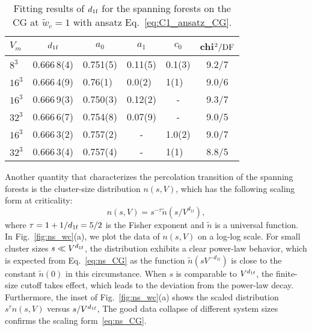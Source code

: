 \begin{table}[tb]
\centering
\vspace{3ex}
\caption{Fitting results of ${d_{1\textrm{f}}}$ for the spanning forests on the CG at $\tilde{w}_c = 1$ with ansatz Eq.~\eqref{eq:C1_ansatz_CG}.}
\label{tab:C1_wc_CG} 
\begin{tabular}{|lllllc|}
\hline 
$V_{m}$   &\multicolumn{1}{c}{${d_{1\textrm{f}}}$}   &\multicolumn{1}{c}{$a_0$}    
&\multicolumn{1}{c}{$a_1$} &\multicolumn{1}{c}{$c_0$}
& chi$^2/{\rm DF}$     \\
\hline 
$8^3$     &0.666\,8(4)    &0.751(5)   &0.11(5)    &0.1(3)     &9.2/7\\ 
$16^{3}$    &0.666\,4(9)    &0.76(1)    &0.0(2)     &1(1)       &9.0/6\\ 

$16^{3}$    &0.666\,9(3) 	&0.750(3)  	&0.12(2)   	&\multicolumn{1}{c}{-}	&9.3/7\\ 
$32^{3}$    &0.666\,6(7) 	&0.754(8)  	&0.07(9)   	&\multicolumn{1}{c}{-}	&9.0/5\\ 

$16^{3}$    &0.666\,3(2) 	&0.757(2)  	&\multicolumn{1}{c}{-}     	&1.0(2)    	&9.0/7\\ 
$32^{3}$    &0.666\,3(4) 	&0.757(4)  	&\multicolumn{1}{c}{-}     	&1(1)      	&8.8/5\\ 
\hline 
\end{tabular} 
\vspace{3ex}
\end{table} 

Another quantity that characterizes the percolation transition of the spanning forests is the cluster-size distribution $n(s, V)$, which has the following
scaling form at criticality:
\begin{equation}\label{eq:ns_CG}
	n(s, V) = s^{-\tau} \tilde{n}(s/V^{d_{1\textrm{f}}}),
\end{equation}
where $\tau = 1+ 1/{d_{1\textrm{f}}} = 5/2$ is the Fisher exponent and $\tilde{n}$ is a universal function. 
In Fig.~\ref{fig:ns_wc}(a), we plot the data of $n(s, V)$ on a log-log scale. For small cluster sizes $s \ll V^{{d_{1\textrm{f}}}}$, the distribution exhibits a clear power-law behavior, which
is expected from Eq.~\eqref{eq:ns_CG} as the function $\tilde{n}(s V^{-d_{1\textrm{f}}})$ is close to the constant $\tilde{n}(0)$ in this
circumstance. When $s$ is comparable to $V^{{d_{1\textrm{f}}}}$, the finite-size cutoff takes effect, which leads to the deviation from the power-law decay.
Furthermore, the inset of Fig.~\ref{fig:ns_wc}(a) shows the scaled distribution $s^{\tau}n(s, V)$ versus $s/V^{{d_{1\textrm{f}}}}$, 
The good data collapse of different system sizes confirms the scaling form~\eqref{eq:ns_CG}.

